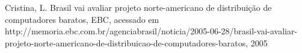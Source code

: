 \documentclass[
12pt,		%
openright,	%
twoside,  %
a4paper,			%
chapter=TITLE,		%
english,			%
french,				%
spanish,			%
brazil				%
]{USPSC-classe/USPSC}
\begin{document}
\begin{flushleft}
\begin{flushleft}
\begin{flushleft}
\begin{flushleft}
\begin{flushleft}
\begin{flushleft}
\begin{flushleft}
\begin{flushleft}
\begin{flushleft}
\begin{flushleft}
\begin{flushleft}
\begin{flushleft}
\begin{flushleft}
\begin{flushleft}
\begin{flushleft}
\begin{flushleft}
\begin{flushleft}
[CRISTINA, 2005] Cristina, L. Brasil vai avaliar projeto norte-americano de distribui\c{c}\~ao de computadores baratos, EBC, acessado em http://memoria.ebc.com.br/agenciabrasil/noticia/2005-06-28/brasil-vai-avaliar-projeto-norte-americano-de-distribuicao-de-computadores-baratos, 2005
\end{flushleft}


\end{flushleft}


\end{flushleft}


\end{flushleft}


\end{flushleft}


\end{flushleft}


\end{flushleft}


\end{flushleft}


\end{flushleft}


\end{flushleft}


\end{flushleft}


\end{flushleft}


\end{flushleft}


\end{flushleft}


\end{flushleft}


\end{flushleft}


\end{flushleft}
\end{document}
